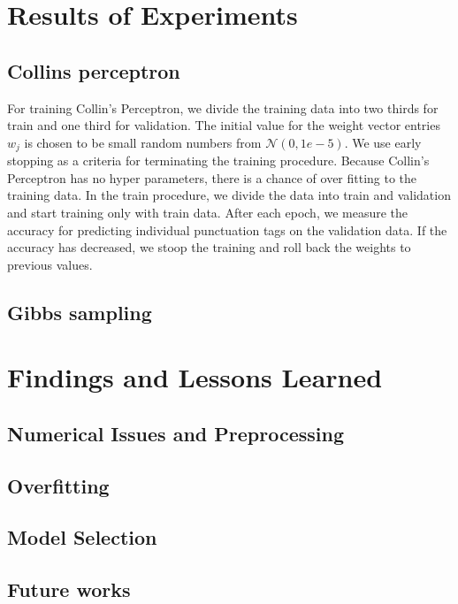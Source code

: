 \documentclass[twoside,12pt]{article}
\begin{document}
\section{Results of Experiments}
\subsection{Collins perceptron}
For training Collin's Perceptron, we divide the training data into two thirds for train and one third for validation. The initial value for the weight vector entries $w_j$ is chosen to be small random numbers from $\mathcal{N}(0,1e-5)$. We use early stopping as a criteria for terminating the training procedure. Because Collin's Perceptron has no hyper parameters, there is a chance of over fitting to the training data. In the train procedure, we divide the data into train and validation and start training only with train data. After each epoch, we measure the accuracy for predicting individual punctuation tags on the validation data. If the accuracy has decreased, we stoop the training and roll back the weights to previous values.\\



\subsection{Gibbs sampling}

\section{Findings and Lessons Learned}
\subsection{Numerical Issues and Preprocessing}
\subsection{Overfitting}
\subsection{Model Selection}
\subsection{Future works}
\end{document}
